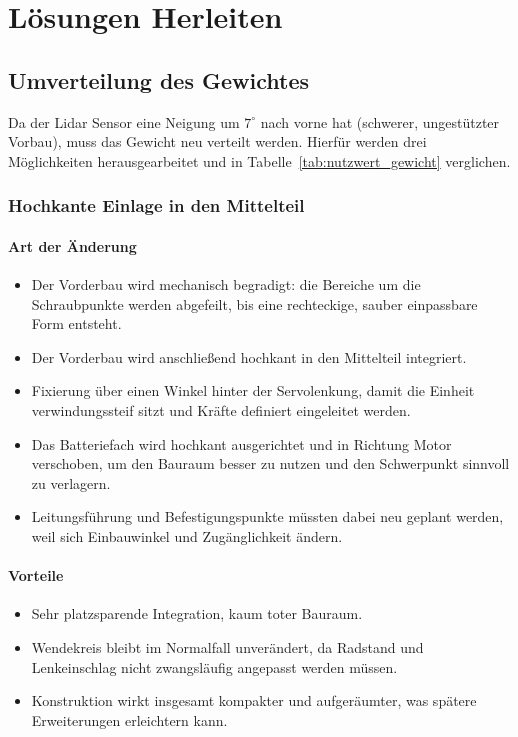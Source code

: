 \section{Lösungen Herleiten}
\subsection{Umverteilung des Gewichtes}
Da der Lidar Sensor eine Neigung um \(7^\circ\) nach vorne hat (schwerer, ungestützter Vorbau), muss das Gewicht neu verteilt werden. Hierfür werden drei Möglichkeiten herausgearbeitet und in Tabelle~\ref{tab:nutzwert_gewicht} verglichen.

\subsubsection{Hochkante Einlage in den Mittelteil}
\paragraph{Art der Änderung}
\begin{itemize}
  \item Der Vorderbau wird mechanisch begradigt: die Bereiche um die Schraubpunkte werden abgefeilt, bis eine rechteckige, sauber einpassbare Form entsteht.
  \item Der Vorderbau wird anschließend hochkant in den Mittelteil integriert.
  \item Fixierung über einen Winkel hinter der Servolenkung, damit die Einheit verwindungssteif sitzt und Kräfte definiert eingeleitet werden.
  \item Das Batteriefach wird hochkant ausgerichtet und in Richtung Motor verschoben, um den Bauraum besser zu nutzen und den Schwerpunkt sinnvoll zu verlagern.
  \item Leitungsführung und Befestigungspunkte müssten dabei neu geplant werden, weil sich Einbauwinkel und Zugänglichkeit ändern.
\end{itemize}

\paragraph{Vorteile}
\begin{itemize}
  \item Sehr platzsparende Integration, kaum toter Bauraum.
  \item Wendekreis bleibt im Normalfall unverändert, da Radstand und Lenkeinschlag nicht zwangsläufig angepasst werden müssen.
  \item Konstruktion wirkt insgesamt kompakter und aufgeräumter, was spätere Erweiterungen erleichtern kann.
\end{itemize}

